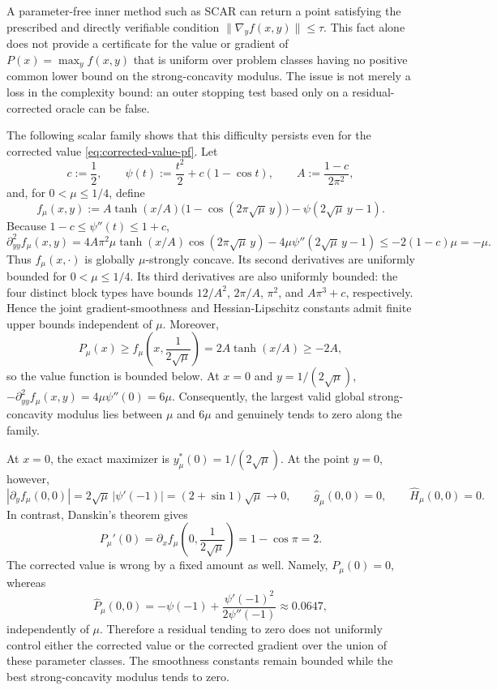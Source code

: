 \documentclass{article}
\begin{document}
A parameter-free inner method such as SCAR can return a point satisfying
the prescribed and directly verifiable condition
$\|\nabla_yf(x,y)\|\le\tau$.  This fact alone does not provide a
certificate for the value or gradient of
$P(x)=\max_y f(x,y)$ that is uniform over problem classes having no
positive common lower bound on the strong-concavity modulus.  The issue
is not merely a loss in the complexity bound: an outer stopping test
based only on a residual-corrected oracle can be false.

The following scalar family shows that this difficulty persists even
for the corrected value \eqref{eq:corrected-value-pf}.  Let
\[
 c:=\frac12,
 \qquad
 \psi(t):=\frac{t^2}{2}+c(1-\cos t),
 \qquad
 A:=\frac{1-c}{2\pi^2},
\]
and, for $0<\mu\le1/4$, define
\begin{equation}\label{eq:scar-counterexample}
 f_\mu(x,y):=A\tanh(x/A)
       \bigl(1-\cos(2\pi\sqrt\mu\,y)\bigr)
       -\psi(2\sqrt\mu\,y-1).
\end{equation}
Because $1-c\le\psi''(t)\le1+c$,
\[
 \partial_{yy}^2 f_\mu(x,y)
 =4A\pi^2\mu\tanh(x/A)\cos(2\pi\sqrt\mu\,y)
   -4\mu\psi''(2\sqrt\mu\,y-1)
 \le-2(1-c)\mu=-\mu.
\]
Thus $f_\mu(x,\cdot)$ is globally $\mu$-strongly concave.  Its
second derivatives are uniformly bounded for $0<\mu\le1/4$.  Its third
derivatives are also uniformly bounded: the four distinct block types
have bounds $12/A^2$, $2\pi/A$, $\pi^2$, and $A\pi^3+c$,
respectively.  Hence the joint gradient-smoothness and
Hessian-Lipschitz constants admit finite upper bounds independent of
$\mu$.  Moreover,
\[
 P_\mu(x)\ge f_\mu\left(x,\frac1{2\sqrt\mu}\right)
 =2A\tanh(x/A)\ge-2A,
\]
so the value function is bounded below.
At $x=0$ and $y=1/(2\sqrt\mu)$,
$-\partial_{yy}^2f_\mu(x,y)=4\mu\psi''(0)=6\mu$.
Consequently, the largest valid global strong-concavity modulus lies
between $\mu$ and $6\mu$ and genuinely tends to zero along the family.

At $x=0$, the exact maximizer is
$y_\mu^*(0)=1/(2\sqrt\mu)$.  At the point $y=0$, however,
\[
 |\partial_yf_\mu(0,0)|
 =2\sqrt\mu\,|\psi'(-1)|
 =(2+\sin 1)\sqrt\mu\longrightarrow0,
 \qquad
 \widehat g_\mu(0,0)=0,
 \qquad
 \widehat H_\mu(0,0)=0.
\]
In contrast, Danskin's theorem gives
\[
 P_\mu'(0)
 =\partial_xf_\mu\left(0,\frac1{2\sqrt\mu}\right)
 =1-\cos\pi=2.
\]
The corrected value is wrong by a fixed amount as well.  Namely,
$P_\mu(0)=0$, whereas
\begin{equation}\label{eq:scar-counterexample-value}
 \widehat P_\mu(0,0)
 =-\psi(-1)+\frac{\psi'(-1)^2}{2\psi''(-1)}
 \approx0.0647,
\end{equation}
independently of $\mu$.  Therefore a residual tending to zero does not
uniformly control either the corrected value or the corrected gradient
over the union of these parameter classes.  The smoothness constants
remain bounded while the best strong-concavity modulus tends to zero.
\end{document}
